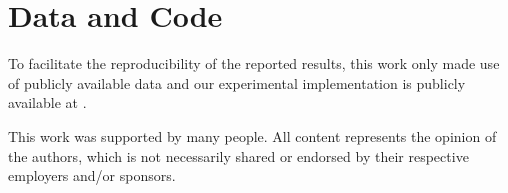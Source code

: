 \documentclass[sigconf,natbib,screen=true,review=true,anonymous]{acmart}
\begin{document}
\section*{Data and Code}
To facilitate the reproducibility of the reported results, this work only made use of publicly available data and our experimental implementation is publicly available at .

\begin{acks}
 This work was supported by many people.
 All content represents the opinion of the authors, which is not necessarily shared or endorsed by their respective employers and/or sponsors.
\end{acks}



\end{document}
